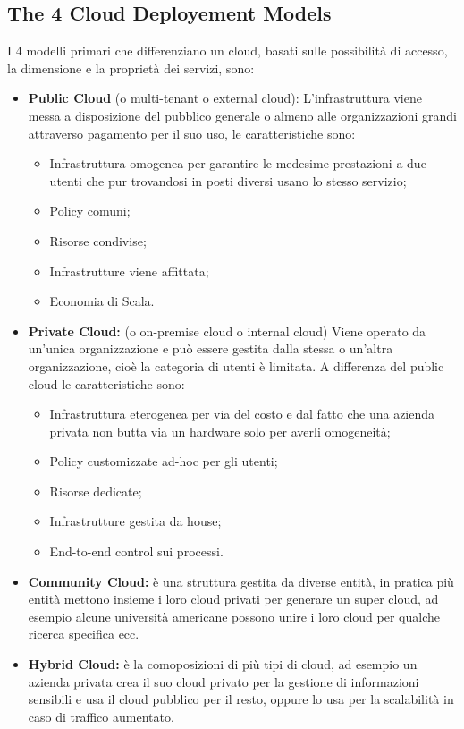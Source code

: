 \documentclass[11pt, twocolumn]{article}
\newenvironment{myitemize}
{ \begin{itemize}[topsep=0ex]
		\setlength{\itemsep}{0pt}
		\setlength{\parskip}{0pt}
		\setlength{\parsep}{0pt}     }
	{ \end{itemize}                  }
\begin{document}
\subsection{The 4 Cloud Deployement Models}
I 4 modelli primari che differenziano un cloud, basati sulle possibilità di accesso, la dimensione e la proprietà dei servizi, sono:
\begin{myitemize}
	\item \textbf{Public Cloud} (o multi-tenant o external cloud): 
	L'infrastruttura viene messa a disposizione del pubblico generale o almeno alle organizzazioni grandi attraverso pagamento per il suo uso, le caratteristiche sono:
	\begin{myitemize}
		\item Infrastruttura omogenea per garantire le medesime prestazioni a due utenti che pur trovandosi in posti diversi usano lo stesso servizio;
		\item Policy comuni;
		\item Risorse condivise;
		\item Infrastrutture viene affittata;
		\item Economia di Scala.
	\end{myitemize} 
	
	\item \textbf{Private Cloud:} (o on-premise cloud o internal cloud)
	Viene operato da un'unica organizzazione e può essere gestita dalla stessa o un'altra organizzazione, cioè la categoria di utenti è limitata. A differenza del public cloud le caratteristiche sono:
	\begin{myitemize}
		\item Infrastruttura eterogenea per via del costo e dal fatto che una azienda privata non butta via un hardware solo per averli omogeneità;
		\item Policy customizzate ad-hoc per gli utenti;
		\item Risorse dedicate;
		\item Infrastrutture gestita da house;
		\item End-to-end control sui processi.
	\end{myitemize}
	
	\item \textbf{Community Cloud:} è una struttura gestita da diverse entità, in pratica più entità mettono insieme i loro cloud privati per generare un super cloud, ad esempio alcune università americane possono unire i loro cloud per qualche ricerca specifica ecc.
	
	\item \textbf{Hybrid Cloud:} è la comoposizioni di più tipi di cloud, ad esempio un azienda privata crea il suo cloud privato per la gestione di informazioni sensibili e usa il cloud pubblico per il resto, oppure lo usa per la scalabilità in caso di traffico aumentato.
\end{myitemize}
\end{document}
